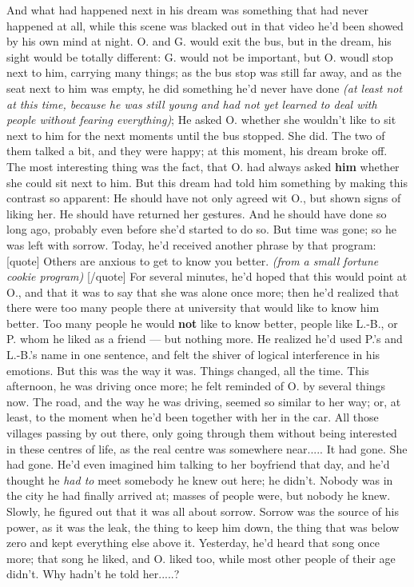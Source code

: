 And what had happened next in his dream was something that had never happened at all, while this scene was blacked out in that video he'd been showed by his own mind at night. 
O. and G. would exit the bus, but in the dream, his sight would be totally different: G. would not be important, but O. woudl stop next to him, carrying many things; as the bus stop was still far away, and as the seat next to him was empty, he did something he'd never have done \emph{(at least not at this time, because he was still young and had not yet learned to deal with people without fearing everything)}; He asked O. whether she wouldn't like to sit next to him for the next moments until the bus stopped. 
She did. 
The two of them talked a bit, and they were happy; at this moment, his dream broke off. 
The most interesting thing was the fact, that O. had always asked \textbf{him} whether she could sit next to him. But this dream had told him something by making this contrast so apparent: He should have not only agreed wit O., but shown signs of liking her. He should have returned her gestures. And he should have done so long ago, probably even before she'd started to do so. 
But time was gone; so he was left with sorrow. 
Today, he'd received another phrase by that program: 
[quote]
Others are anxious to get to know you better. 
\emph{(from a small fortune cookie program)}
[/quote]
For several minutes, he'd hoped that this would point at O., and that it was to say that she was alone once more; then he'd realized that there were too many people there at university that would like to know him better. 
Too many people he would \textbf{not} like to know better, people like L.-B., or P. whom he liked as a friend --- but nothing more. 
He realized he'd used P.'s and L.-B.'s name in one sentence, and felt the shiver of logical interference in his emotions. 
But this was the way it was. Things changed, all the time. 
This afternoon, he was driving once more; he felt reminded of O. by several things now. The road, and the way he was driving, seemed so similar to her way; or, at least, to the moment when he'd been together with her in the car. All those villages passing by out there, only going through them without being interested in these centres of life, as the real centre was somewhere near.....
It had gone. She had gone. He'd even imagined him talking to her boyfriend that day, and he'd thought he \emph{had to} meet somebody he knew out here; he didn't. Nobody was in the city he had finally arrived at; masses of people were, but nobody he knew. 
Slowly, he figured out that it was all about sorrow. Sorrow was the source of his power, as it was the leak, the thing to keep him down, the thing that was below zero and kept everything else above it. Yesterday, he'd heard that song once more; that song he liked, and O. liked too, while most other people of their age didn't. Why hadn't he told her.....?
